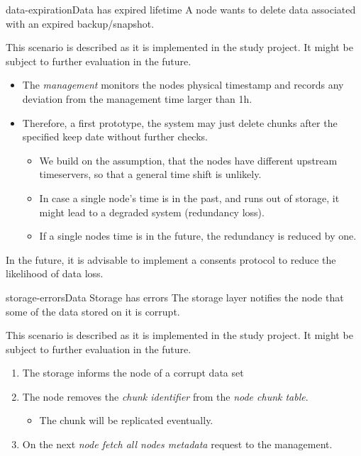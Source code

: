 \begin{scenario}{data-expiration}{Data has expired lifetime}
    A node wants to delete data associated with an expired backup/snapshot.
   
	This scenario is described as it is implemented in the study project. It might be subject to further evaluation in the future.
	
	\begin{itemize}
	\item The \emph{management} monitors the nodes physical timestamp and records any deviation from the management time larger than 1h.
	\item Therefore, a first prototype, the system may just delete chunks after the specified keep date without further checks.
	   	\begin{itemize}
	   		\item We build on the assumption, that the nodes have different upstream timeservers, so that a general time shift is unlikely.
	   		\item In case a single node's time is in the past, and runs out of storage, it might lead to a degraded system (redundancy loss).
	   		\item If a single nodes time is in the future, the redundancy is reduced by one.
	   	\end{itemize}
	\end{itemize}
	
	In the future, it is advisable to implement a consents protocol to reduce the likelihood of data loss.
\end{scenario}

\begin{scenario}{storage-errors}{Data Storage has errors}
    The storage layer notifies the node that some of the data stored on it is corrupt.
    
	This scenario is described as it is implemented in the study project. It might be subject to further evaluation in the future.
    
    \begin{enumerate}
    	\item The storage informs the node of a corrupt data set
    	\item The node removes the \emph{chunk identifier} from the \emph{node chunk table}.
    		\begin{itemize}
    			\item The chunk will be replicated eventually.
    		\end{itemize}
    	\item On the next \emph{node fetch all nodes metadata} request to the management.
    \end{enumerate}
\end{scenario}

